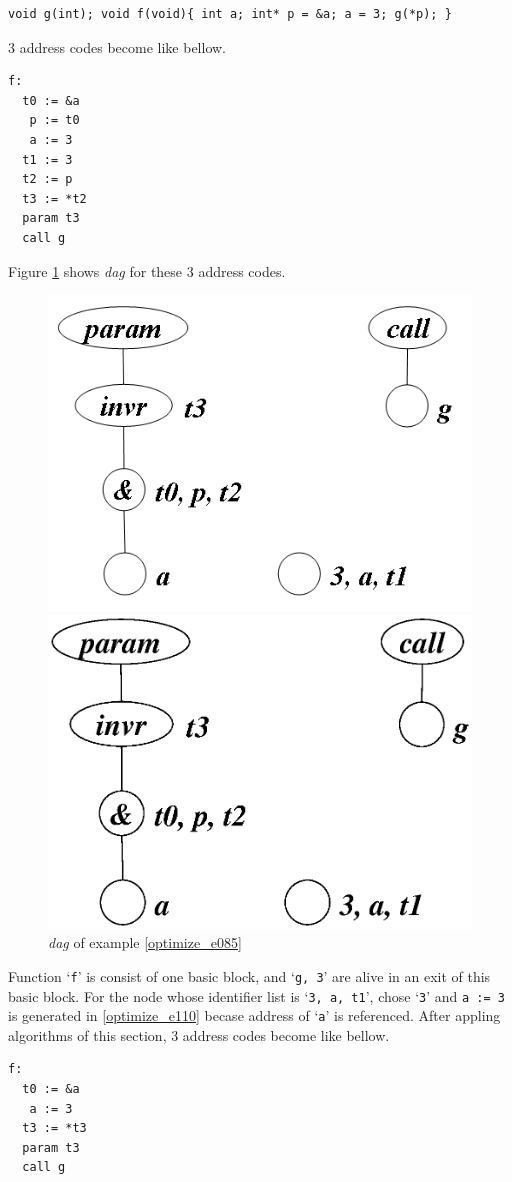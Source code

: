 \begin{Example}
\label{optimize_e085}
\begin{verbatim}
void g(int); void f(void){ int a; int* p = &a; a = 3; g(*p); }
\end{verbatim}
3 address codes become like bellow.
\begin{verbatim}
f:
  t0 := &a
   p := t0
   a := 3
  t1 := 3
  t2 := p
  t3 := *t2
  param t3
  call g
\end{verbatim}
Figure \ref{optimize_e086} shows {\em dag} for these 3 address codes.
\begin{figure}[htbp]
\begin{center}
\begin{htmlonly}
\includegraphics[width=0.7\linewidth,height=0.529\linewidth]{opt036.png}
\end{htmlonly}
\begin{latexonly}
\includegraphics[width=0.7\linewidth,height=0.529\linewidth]{opt036.eps}
\end{latexonly}
\caption{{\em dag} of example \ref{optimize_e085}}
\label{optimize_e086}
\end{center}
\end{figure}
Function `{\tt{f}}' is consist of one basic block,
and `{\tt{g, 3}}' are alive in an exit of this basic block.
For the node whose identifier list is `{\tt{3, a, t1}}',
chose `{\tt{3}}' and {\tt{a := 3}} is generated in 
\ref{optimize_e110} becase address of `{\tt{a}}' is referenced.
After appling algorithms of this section,
3 address codes become like bellow.
\begin{verbatim}
f:
  t0 := &a
   a := 3
  t3 := *t3
  param t3
  call g
\end{verbatim}
\end{Example}

